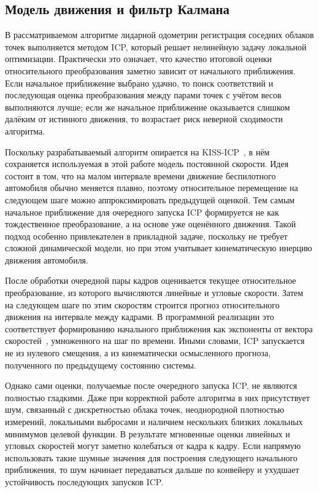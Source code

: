 \subsection{Модель движения и фильтр Калмана}
\label{sec:2-4-motion-model-kalman}

В рассматриваемом алгоритме лидарной одометрии регистрация соседних облаков точек выполняется методом ICP, который решает нелинейную задачу локальной оптимизации. Практически это означает, что качество итоговой оценки относительного преобразования заметно зависит от начального приближения. Если начальное приближение выбрано удачно, то поиск соответствий и последующая оценка преобразования между парами точек с учётом весов выполняются лучше; если же начальное приближение оказывается слишком далёким от истинного движения, то возрастает риск неверной сходимости алгоритма.

Поскольку разрабатываемый алгоритм опирается на KISS-ICP~\cite{kiss-icp}, в нём сохраняется используемая в этой работе модель постоянной скорости. Идея состоит в том, что на малом интервале времени движение беспилотного автомобиля обычно меняется плавно, поэтому относительное перемещение на следующем шаге можно аппроксимировать предыдущей оценкой. Тем самым начальное приближение для очередного запуска ICP формируется не как тождественное преобразование, а на основе уже оценённого движения. Такой подход особенно привлекателен в прикладной задаче, поскольку не требует сложной динамической модели, но при этом учитывает кинематическую инерцию движения автомобиля.

После обработки очередной пары кадров оценивается текущее относительное преобразование, из которого вычисляются линейные и угловые скорости. Затем на следующем шаге по этим скоростям строится прогноз относительного движения на интервале между кадрами. В программной реализации это соответствует формированию начального приближения как экспоненты от вектора скоростей~\cite{scipy-rigidtransform-from-exp-coords}, умноженного на шаг по времени. Иными словами, ICP запускается не из нулевого смещения, а из кинематически осмысленного прогноза, полученного по предыдущему состоянию системы.

Однако сами оценки, получаемые после очередного запуска ICP, не являются полностью гладкими. Даже при корректной работе алгоритма в них присутствует шум, связанный с дискретностью облака точек, неоднородной плотностью измерений, локальными выбросами и наличием нескольких близких локальных минимумов целевой функции. В результате мгновенные оценки линейных и угловых скоростей могут заметно колебаться от кадра к кадру. Если напрямую использовать такие шумные значения для построения следующего начального приближения, то шум начинает передаваться дальше по конвейеру и ухудшает устойчивость последующих запусков ICP.

